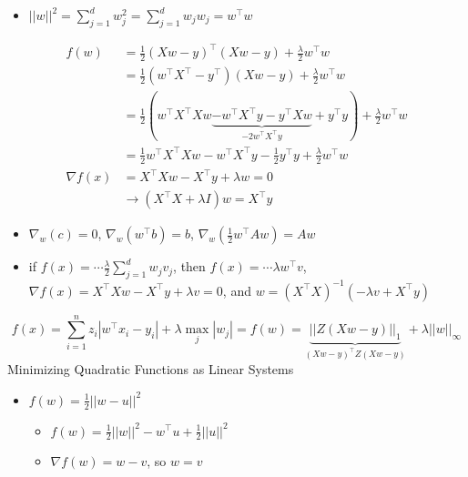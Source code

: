 \documentclass[10pt,landscape,a4paper]{article}
\begin{document}
\begin{multicols*}{5}
\begin{itemize}
    \item \(||w||^2 = \sum\limits_{j=1}^{d} w_j^2 = \sum\limits_{j=1}^{d} w_j w_j = w^\intercal w \)
\end{itemize}
\begin{align*}
    f(w) &= \frac{1}{2} (Xw-y)^\intercal (Xw-y) + \frac{\lambda}{2} w^\intercal w \\
    &= \frac{1}{2} (w^\intercal X^\intercal - y^\intercal)(Xw-y) + \frac{\lambda}{2} w^\intercal w \\
    &= \frac{1}{2} (w^\intercal X^\intercal X w \underbrace{-w^\intercal X^\intercal y - y^\intercal X w}_{-2w^\intercal X^\intercal y} + y^\intercal y) + \frac{\lambda}{2} w^\intercal w \\
    &= \frac{1}{2} w^\intercal X^\intercal Xw - w^\intercal X^\intercal y - \frac{1}{2} y^\intercal y + \frac{\lambda}{2} w^\intercal w \\
    \nabla f(x) &= X^\intercal Xw - X^\intercal y + \lambda w = 0 \\
    & \rightarrow (X^\intercal X + \lambda I) w = X^\intercal y
\end{align*}
\begin{itemize}
    \item \(\nabla_w (c) = 0\), \(\nabla_w (w^\intercal b) = b\), \(\nabla_w (\frac{1}{2} w^\intercal A w) = Aw\)
\end{itemize}
\begin{itemize}
    \item if \(f(x) = \cdots \frac{\lambda}{2} \sum\limits_{j=1}^{d} w_j v_j\), then \(f(x) = \cdots \lambda w^\intercal v\), \(\nabla f(x) = X^\intercal Xw - X^\intercal y + \lambda v = 0\), and \(w = (X^\intercal X)^{-1} (- \lambda v + X^\intercal y)\)
\end{itemize}
\begin{dmath*}
    f(x) = \sum\limits_{i=1}^{n} z_i |w^\intercal x_i - y_i| + \lambda \max_j |w_j|
    = f(w) = \underbrace{||Z(Xw - y)||_1}_{(Xw-y)^\intercal Z (Xw-y)} + \lambda ||w||_{\infty}
\end{dmath*}
Minimizing Quadratic Functions as Linear Systems
\begin{itemize}
    \item \(f(w) = \frac{1}{2} ||w-u||^2\)
    \begin{itemize}
        \item \(f(w) = \frac{1}{2} ||w||^2 -w^\intercal u + \frac{1}{2} ||u||^2\)
        \item \(\nabla f(w) = w-v\), so \(w = v\)
    \end{itemize}

\end{itemize}
\end{multicols*}
\end{document}
